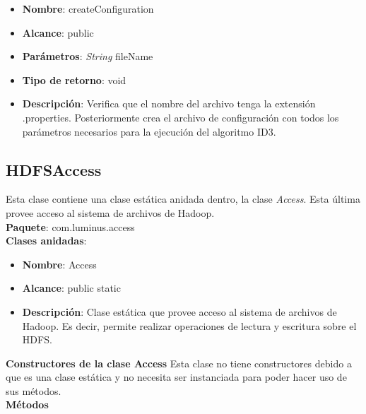 \begin{itemize}
		\item \textbf{Nombre}: createConfiguration
		\item \textbf{Alcance}: public
		\item \textbf{Parámetros}: \emph{String} fileName
		\item \textbf{Tipo de retorno}: void
		\item \textbf{Descripción}: Verifica que el nombre del archivo tenga la extensión .properties. Posteriormente crea el archivo de configuración con todos los parámetros necesarios para la ejecución del algoritmo ID3.\\
\end{itemize}
\subsection{HDFSAccess}
Esta clase contiene una clase estática anidada dentro, la clase \emph{Access}. Esta última provee acceso al sistema de archivos de Hadoop.\\
\textbf{Paquete}: com.luminus.access\\
\textbf{Clases anidadas}:
\begin{UClist}
	\begin{itemize}
		\item \textbf{Nombre}: Access
		\item \textbf{Alcance}: public static
		\item \textbf{Descripción}: Clase estática que provee acceso al sistema de archivos de Hadoop. Es decir, permite realizar operaciones de lectura y escritura sobre el HDFS.\\
	\end{itemize}
\end{UClist}
\textbf{Constructores de la clase Access}
Esta clase no tiene constructores debido a que es una clase estática y no necesita ser instanciada para poder hacer uso de sus métodos.\\
\textbf{Métodos}
